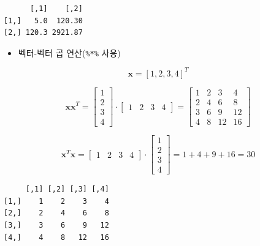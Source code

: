 \documentclass[
  11pt,
]{krantz}
\newenvironment{Shaded}{\begin{snugshade}}{\end{snugshade}}
\newcommand{\CommentTok}[1]{\textcolor[rgb]{0.37,0.37,0.37}{\textit{#1}}}
\newcommand{\DecValTok}[1]{\textcolor[rgb]{0.06,0.06,0.06}{#1}}
\newcommand{\KeywordTok}[1]{\textcolor[rgb]{0.27,0.27,0.27}{\textbf{#1}}}
\newcommand{\NormalTok}[1]{#1}
\newcommand{\OperatorTok}[1]{\textcolor[rgb]{0.43,0.43,0.43}{\textbf{#1}}}
\newcommand{\StringTok}[1]{\textcolor[rgb]{0.5,0.5,0.5}{#1}}
\providecommand{\tightlist}{%
  \setlength{\itemsep}{0pt}\setlength{\parskip}{0pt}}
\begin{document}
\begin{verbatim}
      [,1]    [,2]
[1,]   5.0  120.30
[2,] 120.3 2921.87
\end{verbatim}

\normalsize

\begin{itemize}
\tightlist
\item
  벡터-벡터 곱 연산(\texttt{\%*\%} 사용)
\end{itemize}

\[
\mathrm{\mathbf x} = [1, 2, 3, 4]^T
\]

\[\mathrm{\mathbf x}\mathrm{\mathbf x}^T = 
\begin{bmatrix}
1 \\
2 \\
3 \\
4
\end{bmatrix} \cdot
\begin{bmatrix}
1 & 2 & 3 & 4
\end{bmatrix} = 
\begin{bmatrix}
1 & 2 & 3 & 4 \\
2 & 4 & 6 & 8 \\
3 & 6 & 9 & 12 \\
4 & 8 & 12 & 16
\end{bmatrix}
\]

\[\mathrm{\mathbf x}^T\mathrm{\mathbf x} = 
\begin{bmatrix}
1 & 2 & 3 & 4
\end{bmatrix} \cdot
\begin{bmatrix}
1 \\
2 \\
3 \\
4
\end{bmatrix} = 1 + 4 + 9 + 16 = 30
\]

\footnotesize

\begin{Shaded}
\end{Shaded}

\begin{verbatim}
     [,1] [,2] [,3] [,4]
[1,]    1    2    3    4
[2,]    2    4    6    8
[3,]    3    6    9   12
[4,]    4    8   12   16
\end{verbatim}
\end{document}
